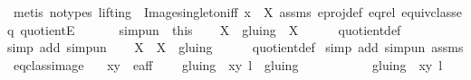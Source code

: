 \begin{isabellebody}
\ {\isacharparenleft}metis\ {\isacharparenleft}no{\isacharunderscore}types{\isacharcomma}\ lifting{\isacharparenright}\ \ Image{\isacharunderscore}singleton{\isacharunderscore}iff\ {\isacartoucheopen}x\ {\isasymin}\ X{\isacartoucheclose}\ assms{\isacharparenleft}{}{\isacharparenright}\ e{\isacharunderscore}proj{\isacharunderscore}def\ eq{\isacharunderscore}rel\ equiv{\isacharunderscore}class{\isacharunderscore}eq\ quotientE{\isacharparenright}\isanewline
\ \ \isacommand{{\isacharbraceright}}\isamarkupfalse%
\isanewline
\ \ \isamarkupfalse%
\ simp{\isacharunderscore}un\ {\isacharequal}\ this\isanewline
\ \ \isamarkupfalse%
\ {\isachardoublequoteopen}X\ {\isacharslash}{\isacharslash}\ gluing\ {\isasymsubseteq}\ {\isacharbraceleft}X{\isacharbraceright}{\isachardoublequoteclose}\isanewline
\ \ \ \ \isamarkupfalse%
\ quotient{\isacharunderscore}def\ \isamarkupfalse%
{\isacharparenleft}simp\ add{\isacharcolon}\ simp{\isacharunderscore}un{\isacharparenright}\isanewline
\ \ \isamarkupfalse%
\ {\isachardoublequoteopen}{\isacharbraceleft}X{\isacharbraceright}\ {\isasymsubseteq}\ X\ {\isacharslash}{\isacharslash}\ gluing{\isachardoublequoteclose}\isanewline
\ \ \ \ \isamarkupfalse%
\ quotient{\isacharunderscore}def\ \isamarkupfalse%
{\isacharparenleft}simp\ add{\isacharcolon}\ simp{\isacharunderscore}un\ assms{\isacharparenright}\isanewline
{}\isamarkupfalse%
%
\endisatagproof
{\isafoldproof}%
%
\isadelimproof
\isanewline
%
\endisadelimproof
\isanewline
{}\isamarkupfalse%
\ eq{\isacharunderscore}class{\isacharunderscore}image{\isacharcolon}\isanewline
\ \ \ {\isachardoublequoteopen}{\isacharparenleft}x{\isacharcomma}y{\isacharparenright}\ {\isasymin}\ e{\isacharunderscore}aff{\isachardoublequoteclose}\ \isanewline
\ \ \ {\isachardoublequoteopen}{\isacharparenleft}gluing\ {\isacharbackquote}{\isacharbackquote}\ {\isacharbraceleft}{\isacharparenleft}{\isacharparenleft}x{\isacharcomma}y{\isacharparenright}{\isacharcomma}\ l{\isacharparenright}{\isacharbraceright}{\isacharparenright}\ {\isacharslash}{\isacharslash}\ gluing\ {\isacharequal}\ \isanewline
\ \ \ \ \ \ \ \ \ {\isacharbraceleft}gluing\ {\isacharbackquote}{\isacharbackquote}\ {\isacharbraceleft}{\isacharparenleft}{\isacharparenleft}x{\isacharcomma}y{\isacharparenright}{\isacharcomma}\ l{\isacharparenright}{\isacharbraceright}{\isacharbraceright}{\isachardoublequoteclose}\isanewline
%
\isadelimproof
%
\endisadelimproof

\end{isabellebody}
